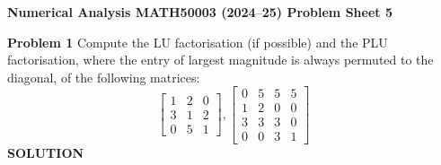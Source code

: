 \documentclass[12pt,a4paper]{article}
\def\endash{–}
\begin{document}
\textbf{Numerical Analysis MATH50003 (2024\ensuremath{\endash}25) Problem Sheet 5}

\textbf{Problem 1} Compute the LU factorisation (if possible) and the PLU factorisation, where the entry of largest magnitude is always permuted to the diagonal, of the following matrices:
\[
\begin{bmatrix}
1 & 2 & 0 \\
3 & 1 & 2 \\
0 & 5 & 1
\end{bmatrix}, \begin{bmatrix}
0 &  5 & 5 & 5 \\
1 & 2 & 0 & 0 \\
3 & 3 & 3 & 0 \\
0 & 0  & 3 & 1
\end{bmatrix}
\]
\textbf{SOLUTION}
\end{document}
